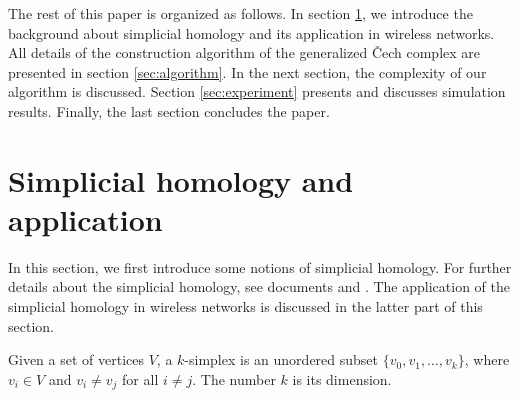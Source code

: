 \documentclass[conference]{IEEEtran}
\begin{document}
The rest of this paper is organized as follows. In section \ref{sec:SimplicialHomology}, we introduce the background about simplicial homology and its application in wireless networks. All details of the construction algorithm of the generalized \v{C}ech complex are presented in section \ref{sec:algorithm}. In the next section, the complexity of our algorithm is discussed. Section \ref{sec:experiment} presents and discusses simulation results. Finally, the last section concludes the paper.\par













































\section{Simplicial homology and application}
\label{sec:SimplicialHomology}
In this section, we first introduce some notions of simplicial homology. For further details about the simplicial homology, see documents \cite{bookMunkres} and
\cite{bookHatcher}. The application of the simplicial homology in wireless networks is discussed in the latter part of this section.

Given a set of vertices $V$, a $k$-simplex is an
unordered subset $\{v_0, v_1, \ldots, v_k\}$, where $v_i \in V$ and
$v_i \neq v_j$ for all $i \neq j$. The number $k$ is its
dimension. 
\end{document}
